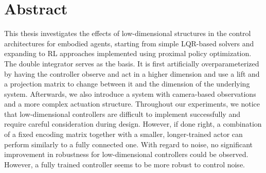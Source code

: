 \documentclass[12pt,final,twoside]{report}
\theoremstyle{plain}
\theoremstyle{definition}
\theoremstyle{remark}
\begin{document}
\thispagestyle{empty}
\hspace{1cm}
\newpage

\section*{Abstract}
\label{sec:abstract}
This thesis investigates the effects of low-dimensional structures in the control architectures for
embodied agents, starting from simple LQR-based solvers and expanding to RL approaches implemented using proximal
policy optimization. The double integrator serves as the basis. It is first artificially overparameterized by
having the controller observe and act in a higher dimension and use a lift and a projection matrix to change between it and the
dimension of the underlying system. Afterwards, we also introduce a system with camera-based observations and a more complex actuation structure.
Throughout our experiments, we notice that low-dimensional controllers are difficult to implement successfully and
require careful consideration during design. However, if done right, a combination of a fixed encoding matrix
together with a smaller, longer-trained actor can perform similarly to a fully connected one. With regard to noise,
no significant improvement in robustness for low-dimensional controllers could be observed.
However, a fully trained controller seems to be more robust to control noise.

\vfill
\end{document}
